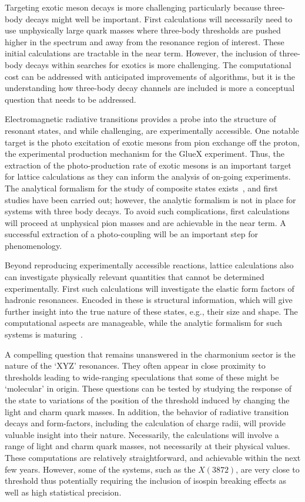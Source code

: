 Targeting exotic meson decays is more challenging particularly because three-body decays might well be important. First calculations will necessarily need to use unphysically large quark masses where three-body thresholds are pushed higher in the spectrum and away from the resonance region of interest.
These initial calculations are tractable in the near term. However, the inclusion of three-body decays within searches for exotics is more challenging. The computational cost can be addressed with anticipated improvements of algorithms, but it is the understanding how three-body decay channels are included is more a conceptual question that needs to be addressed.


Electromagnetic radiative transitions provides a probe into the structure of resonant states, and while challenging, are experimentally accessible. 
One notable target is the photo excitation of exotic mesons from pion exchange off the proton, the experimental production mechanism for the GlueX experiment. Thus, the extraction of the photo-production rate of exotic mesons is an important target for lattice calculations as they can inform the analysis of on-going experiments. The analytical formalism for the study of composite states exists~\cite{Briceno:2015tza}, and first studies have been carried out; however, the analytic formalism is not in place for systems with three body decays. To avoid such complications, first calculations will proceed at unphysical pion masses and are achievable in the near term. A successful extraction of a photo-coupling will be an important step for phenomenology.

Beyond reproducing experimentally accessible reactions, lattice calculations also can investigate physically relevant quantities that cannot be determined experimentally. First such calculations will investigate the elastic form factors of hadronic resonances. Encoded in these is structural information, which will give further insight into the true nature of these states, e.g., their size and shape. The computational aspects are manageable, while the analytic formalism for such systems is maturing~\cite{Briceno:2015tza,Baroni:2018unx}.


A compelling question that remains unanswered in the charmonium sector is the nature of the `XYZ' resonances. They often appear in close proximity to thresholds leading to wide-ranging speculations that some of these might be `molecular' in origin. These questions can be tested by studying the response of the state to variations of the position of the threshold induced by changing the light and charm quark masses. In addition, the behavior of radiative transition decays and form-factors, including the calculation of charge radii, will provide valuable insight into their nature. Necessarily, the calculations will involve a range of light and charm quark masses, not necessarily at their physical values.  These computations are relatively straightforward, and achievable within the next few years. However, some of the systems, such as the $X(3872)$, are very close to threshold thus potentially requiring the inclusion of isospin breaking effects as well as high statistical precision.


